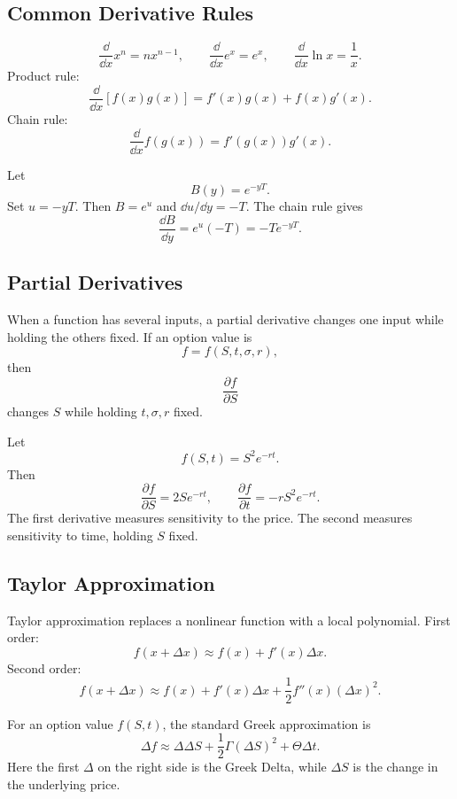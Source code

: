\subsection{Common Derivative Rules}

\[
    \frac{\dd}{\dd x}x^n = nx^{n-1},
    \qquad
    \frac{\dd}{\dd x}e^x=e^x,
    \qquad
    \frac{\dd}{\dd x}\ln x=\frac{1}{x}.
\]
Product rule:
\[
    \frac{\dd}{\dd x}[f(x)g(x)]
    =
    f'(x)g(x)+f(x)g'(x).
\]
Chain rule:
\[
    \frac{\dd}{\dd x}f(g(x))=f'(g(x))g'(x).
\]

\begin{exmp}
Let
\[
    B(y)=e^{-yT}.
\]
Set $u=-yT$. Then $B=e^u$ and $\dd u/\dd y=-T$. The chain rule gives
\[
    \frac{\dd B}{\dd y}=e^u(-T)=-Te^{-yT}.
\]
\end{exmp}

\subsection{Partial Derivatives}

When a function has several inputs, a partial derivative changes one input while
holding the others fixed. If an option value is
\[
    f=f(S,t,\sigma,r),
\]
then
\[
    \frac{\partial f}{\partial S}
\]
changes $S$ while holding $t,\sigma,r$ fixed.

\begin{exmp}
Let
\[
    f(S,t)=S^2e^{-rt}.
\]
Then
\[
    \frac{\partial f}{\partial S}=2Se^{-rt},
    \qquad
    \frac{\partial f}{\partial t}=-rS^2e^{-rt}.
\]
The first derivative measures sensitivity to the price. The second measures
sensitivity to time, holding $S$ fixed.
\end{exmp}

\subsection{Taylor Approximation}

Taylor approximation replaces a nonlinear function with a local polynomial.
First order:
\[
    f(x+\Delta x)\approx f(x)+f'(x)\Delta x.
\]
Second order:
\[
    f(x+\Delta x)
    \approx
    f(x)+f'(x)\Delta x+\frac{1}{2}f''(x)(\Delta x)^2.
\]

For an option value $f(S,t)$, the standard Greek approximation is
\[
    \Delta f
    \approx
    \Delta \Delta S
    +\frac{1}{2}\Gamma(\Delta S)^2
    +\Theta \Delta t.
\]
Here the first $\Delta$ on the right side is the Greek Delta, while $\Delta S$
is the change in the underlying price.

